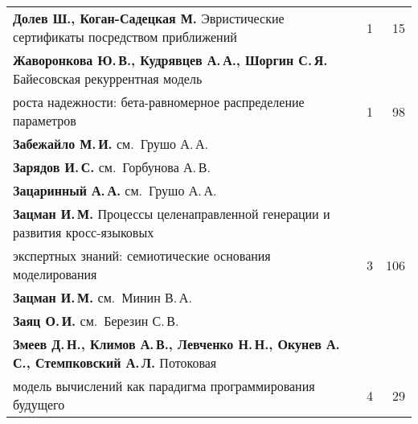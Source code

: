 {\begin{tabular}{p{388pt}rr}
\textbf{Долев Ш., Коган-Садецкая М.} Эвристические сертификаты
посредством приближений&1&15\\
\textbf{Жаворонкова Ю.\,В., Кудрявцев А.\,А., Шоргин С.\,Я.}
Байесовская рекуррентная модель\linebreak
\\[-12pt]
\hspace*{21pt}роста надежности: бета-равномерное
распределение параметров&1&98\\
\textbf{Забежайло М.\,И.} см.\ Грушо А.\,А.&&\\
\textbf{Зарядов И.\,С.} см.\ Горбунова А.\,В.&&\\
\textbf{Зацаринный А.\,А.} см.\ Грушо А.\,А.&&\\
\textbf{Зацман И.\,М.} Процессы целенаправленной генерации и развития
кросс-языковых\linebreak
\\[-12pt]
\hspace*{21pt}экспертных знаний: семиотические основания
моделирования&3&106\\
\textbf{Зацман И.\,М.} см.\ Минин В.\,А.&&\\
\textbf{Заяц О.\,И.} см.\ Березин С.\,В.&&\\
\textbf{Змеев Д.\,Н., Климов А.\,В., Левченко Н.\,Н., Окунев А.\,С.,
Стемпковский А.\,Л.} Потоковая\linebreak
\\[-12pt]
\hspace*{21pt}модель вычислений как парадигма
программирования будущего&4&29\\
\end{tabular}
}

\pagebreak

\def\leftkol{АВТОРСКИЙ УКАЗАТЕЛЬ ЗА 2015 г.} %

\def\rightkol{АВТОРСКИЙ УКАЗАТЕЛЬ ЗА 2015 г.} %

\def\leftfootline{\small{\textbf{\thepage}
\hfill ИНФОРМАТИКА И ЕЁ ПРИМЕНЕНИЯ\ \ \ том~9\ \ \ выпуск~4\ \ \ 2015}
}%
 \def\rightfootline{\small{ИНФОРМАТИКА И ЕЁ ПРИМЕНЕНИЯ\ \ \ том~9\ \ \ выпуск~4\ \ \ 2015
 \hfill \textbf{\thepage}}}


